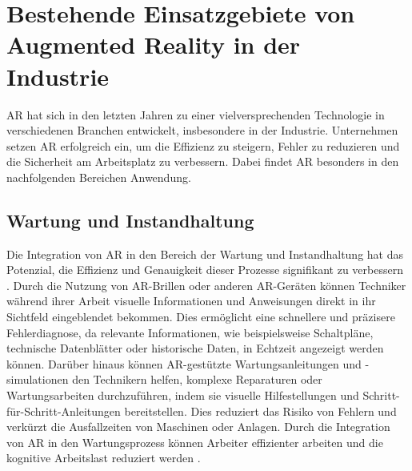 \section{Bestehende Einsatzgebiete von Augmented Reality in der Industrie}

AR hat sich in den letzten Jahren zu einer vielversprechenden Technologie in
verschiedenen Branchen entwickelt, insbesondere in der Industrie. Unternehmen
setzen AR erfolgreich ein, um die Effizienz zu steigern, Fehler zu reduzieren
und die Sicherheit am Arbeitsplatz zu verbessern. Dabei findet AR besonders in
den nachfolgenden Bereichen Anwendung.

\subsection{Wartung und Instandhaltung}
Die Integration von AR in den Bereich der Wartung und Instandhaltung hat das
Potenzial, die Effizienz und Genauigkeit dieser Prozesse signifikant zu
verbessern \cite{liu2022probing}. Durch die Nutzung von AR-Brillen oder anderen
AR-Geräten können Techniker während ihrer Arbeit visuelle Informationen und
Anweisungen direkt in ihr Sichtfeld eingeblendet bekommen. Dies ermöglicht eine
schnellere und präzisere Fehlerdiagnose, da relevante Informationen, wie
beispielsweise Schaltpläne, technische Datenblätter oder historische Daten, in
Echtzeit angezeigt werden können. Darüber hinaus können AR-gestützte
Wartungsanleitungen und -simulationen den Technikern helfen, komplexe
Reparaturen oder Wartungsarbeiten durchzuführen, indem sie visuelle
Hilfestellungen und Schritt-für-Schritt-Anleitungen bereitstellen.
\cite{4079262} Dies reduziert das Risiko von Fehlern und verkürzt die
Ausfallzeiten von Maschinen oder Anlagen. Durch die Integration von AR in den
Wartungsprozess können Arbeiter effizienter arbeiten und die kognitive
Arbeitslast reduziert werden \cite{5620905}.

